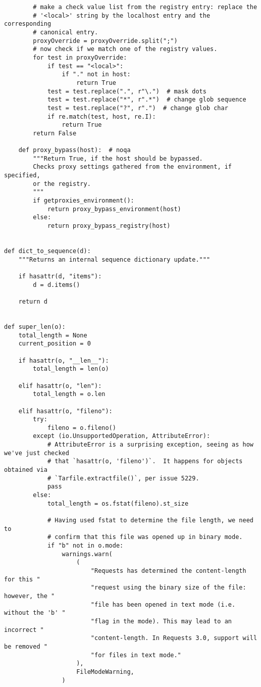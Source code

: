 \begin{code}
\begin{verbatim}
        # make a check value list from the registry entry: replace the
        # '<local>' string by the localhost entry and the corresponding
        # canonical entry.
        proxyOverride = proxyOverride.split(";")
        # now check if we match one of the registry values.
        for test in proxyOverride:
            if test == "<local>":
                if "." not in host:
                    return True
            test = test.replace(".", r"\.")  # mask dots
            test = test.replace("*", r".*")  # change glob sequence
            test = test.replace("?", r".")  # change glob char
            if re.match(test, host, re.I):
                return True
        return False

    def proxy_bypass(host):  # noqa
        """Return True, if the host should be bypassed.
        Checks proxy settings gathered from the environment, if specified,
        or the registry.
        """
        if getproxies_environment():
            return proxy_bypass_environment(host)
        else:
            return proxy_bypass_registry(host)


def dict_to_sequence(d):
    """Returns an internal sequence dictionary update."""

    if hasattr(d, "items"):
        d = d.items()

    return d


def super_len(o):
    total_length = None
    current_position = 0

    if hasattr(o, "__len__"):
        total_length = len(o)

    elif hasattr(o, "len"):
        total_length = o.len

    elif hasattr(o, "fileno"):
        try:
            fileno = o.fileno()
        except (io.UnsupportedOperation, AttributeError):
            # AttributeError is a surprising exception, seeing as how we've just checked
            # that `hasattr(o, 'fileno')`.  It happens for objects obtained via
            # `Tarfile.extractfile()`, per issue 5229.
            pass
        else:
            total_length = os.fstat(fileno).st_size

            # Having used fstat to determine the file length, we need to
            # confirm that this file was opened up in binary mode.
            if "b" not in o.mode:
                warnings.warn(
                    (
                        "Requests has determined the content-length for this "
                        "request using the binary size of the file: however, the "
                        "file has been opened in text mode (i.e. without the 'b' "
                        "flag in the mode). This may lead to an incorrect "
                        "content-length. In Requests 3.0, support will be removed "
                        "for files in text mode."
                    ),
                    FileModeWarning,
                )


\end{verbatim}
\end{code}
